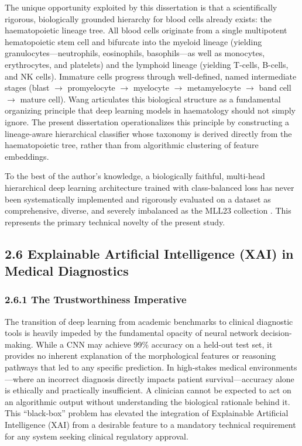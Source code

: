 \documentclass[11pt]{article}
\begin{document}
The unique opportunity exploited by this dissertation is that a scientifically rigorous, biologically grounded hierarchy for blood cells already exists: the haematopoietic lineage tree. All blood cells originate from a single multipotent hematopoietic stem cell and bifurcate into the myeloid lineage (yielding granulocytes—neutrophils, eosinophils, basophils—as well as monocytes, erythrocytes, and platelets) and the lymphoid lineage (yielding T-cells, B-cells, and NK cells). Immature cells progress through well-defined, named intermediate stages (blast $\rightarrow$ promyelocyte $\rightarrow$ myelocyte $\rightarrow$ metamyelocyte $\rightarrow$ band cell $\rightarrow$ mature cell). Wang \cite{wang2024} articulates this biological structure as a fundamental organizing principle that deep learning models in haematology should not simply ignore. The present dissertation operationalizes this principle by constructing a lineage-aware hierarchical classifier whose taxonomy is derived directly from the haematopoietic tree, rather than from algorithmic clustering of feature embeddings.

To the best of the author's knowledge, a biologically faithful, multi-head hierarchical deep learning architecture trained with class-balanced loss has never been systematically implemented and rigorously evaluated on a dataset as comprehensive, diverse, and severely imbalanced as the MLL23 collection \cite{mll23}. This represents the primary technical novelty of the present study.

\subsection*{2.6 Explainable Artificial Intelligence (XAI) in Medical Diagnostics}

\subsubsection*{2.6.1 The Trustworthiness Imperative}

The transition of deep learning from academic benchmarks to clinical diagnostic tools is heavily impeded by the fundamental opacity of neural network decision-making. While a CNN may achieve 99\% accuracy on a held-out test set, it provides no inherent explanation of the morphological features or reasoning pathways that led to any specific prediction. In high-stakes medical environments—where an incorrect diagnosis directly impacts patient survival—accuracy alone is ethically and practically insufficient. A clinician cannot be expected to act on an algorithmic output without understanding the biological rationale behind it. This ``black-box'' problem has elevated the integration of Explainable Artificial Intelligence (XAI) from a desirable feature to a mandatory technical requirement for any system seeking clinical regulatory approval.
\end{document}
